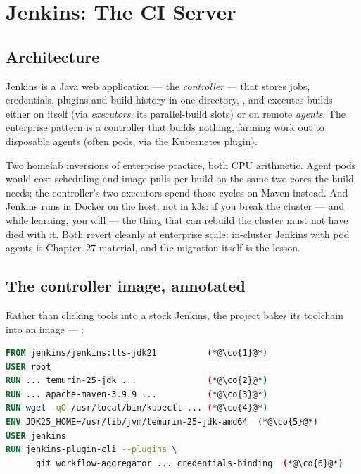 \chapter{Jenkins: The CI Server}
\label{ch:jenkins}

\section{Architecture}

Jenkins is a Java web application --- the \emph{controller} --- that
stores jobs, credentials, plugins and build history in one directory,
, and executes builds either on itself (via
\emph{executors}, its parallel-build slots) or on remote \emph{agents}.
The enterprise pattern is a controller that builds nothing, farming
work out to disposable agents (often pods, via the Kubernetes plugin).

\begin{decision}
Two homelab inversions of enterprise practice, both CPU arithmetic.
Agent pods would cost scheduling and image pulls per build on the same
two cores the build needs; the controller's two executors spend those
cycles on Maven instead. And Jenkins runs in Docker on the host, not in
k3s: if you break the cluster --- and while learning, you will ---
the thing that can rebuild the cluster must not have died with it.
Both revert cleanly at enterprise scale: in-cluster Jenkins with pod
agents is Chapter~27 material, and the migration itself is the lesson.
\end{decision}

\section{The controller image, annotated}

Rather than clicking tools into a stock Jenkins, the project bakes its
toolchain into an image --- :

\begin{lstlisting}[language=dockerfile]
FROM jenkins/jenkins:lts-jdk21          (*@\co{1}@*)
USER root
RUN ... temurin-25-jdk ...              (*@\co{2}@*)
RUN ... apache-maven-3.9.9 ...          (*@\co{3}@*)
RUN wget -qO /usr/local/bin/kubectl ... (*@\co{4}@*)
ENV JDK25_HOME=/usr/lib/jvm/temurin-25-jdk-amd64  (*@\co{5}@*)
USER jenkins
RUN jenkins-plugin-cli --plugins \
      git workflow-aggregator ... credentials-binding  (*@\co{6}@*)
\end{lstlisting}

